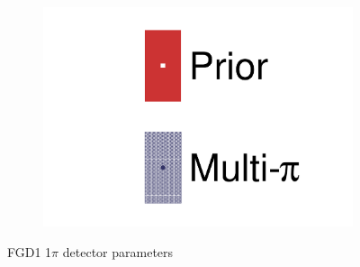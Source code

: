 \begin{figure}[h]
\begin{subfigure}[t]{0.32\textwidth}
		\includegraphics[width=\textwidth,page=30, trim={0mm 0mm 0mm 0mm}, clip]{figures/mach3/2018/data/2018a_FixedCov_RedCov_Mpi_Data_merge_drawPar_withDet}
	\end{subfigure}
	\caption{FGD1 1$\pi$ detector parameters}
	\label{fig:data_multipi_det_fdg1_cc1pi}
\end{figure}

